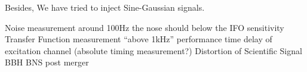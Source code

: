 Besides, We have tried to inject Sine-Gaussian signals.




Noise measurement
around 100Hz  the nose should below the IFO sensitivity
Transfer Function measurement
“above 1kHz” performance
time delay of excitation channel
(absolute timing measurement?)
Distortion of Scientific Signal
BBH
BNS post merger



